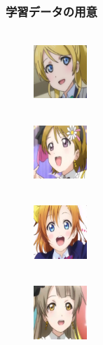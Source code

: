 \documentclass[dvipdfmx,11pt,notheorems]{beamer}
\theoremstyle{definition}
\begin{document}
\begin{frame}\frametitle{学習データの用意}
\begin{figure}[t]
 \begin{minipage}{0.2\hsize}
  \centering
   \\
  \centering
  \includegraphics[width=20mm,bb=0 0 200 200]{./fig/png/faces/eri.png} \\
 \end{minipage}
 \begin{minipage}{0.2\hsize}
  \centering
   \\
  \centering
  \includegraphics[width=20mm,bb=0 0 200 200]{./fig/png/faces/hanayo.png}\\
 \end{minipage}
 \begin{minipage}{0.2\hsize}
  \centering
   \\
  \centering
  \includegraphics[width=20mm,bb=0 0 200 200]{./fig/png/faces/honoka.png}\\
 \end{minipage}
 \begin{minipage}{0.2\hsize}
  \centering
   \\
  \centering
  \includegraphics[width=20mm,bb=0 0 200 200]{./fig/png/faces/kotori.png}\\
 \end{minipage}
\end{figure}
\begin{figure}[t]

\end{figure}
\end{frame}
\end{document}
